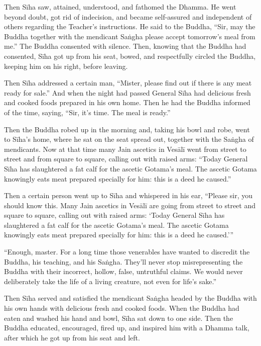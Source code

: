\documentclass[12pt,openany]{book}%
\begin{document}
Then \textsanskrit{Sīha} saw, attained, understood, and fathomed the Dhamma. He went beyond doubt, got rid of indecision, and became self-assured and independent of others regarding the Teacher’s instructions. He said to the Buddha, “Sir, may the Buddha together with the mendicant \textsanskrit{Saṅgha} please accept tomorrow’s meal from me.” The Buddha consented with silence. Then, knowing that the Buddha had consented, \textsanskrit{Sīha} got up from his seat, bowed, and respectfully circled the Buddha, keeping him on his right, before leaving. 

Then \textsanskrit{Sīha} addressed a certain man, “Mister, please find out if there is any meat ready for sale.” And when the night had passed General \textsanskrit{Sīha} had delicious fresh and cooked foods prepared in his own home. Then he had the Buddha informed of the time, saying, “Sir, it’s time. The meal is ready.” 

Then the Buddha robed up in the morning and, taking his bowl and robe, went to \textsanskrit{Sīha}’s home, where he sat on the seat spread out, together with the \textsanskrit{Saṅgha} of mendicants. Now at that time many Jain ascetics in \textsanskrit{Vesālī} went from street to street and from square to square, calling out with raised arms: “Today General \textsanskrit{Sīha} has slaughtered a fat calf for the ascetic Gotama’s meal. The ascetic Gotama knowingly eats meat prepared specially for him: this is a deed he caused.” 

Then a certain person went up to \textsanskrit{Sīha} and whispered in his ear, “Please sir, you should know this. Many Jain ascetics in \textsanskrit{Vesālī} are going from street to street and square to square, calling out with raised arms: ‘Today General \textsanskrit{Sīha} has slaughtered a fat calf for the ascetic Gotama’s meal. The ascetic Gotama knowingly eats meat prepared specially for him: this is a deed he caused.’” 

“Enough, master. For a long time those venerables have wanted to discredit the Buddha, his teaching, and his \textsanskrit{Saṅgha}. They’ll never stop misrepresenting the Buddha with their incorrect, hollow, false, untruthful claims. We would never deliberately take the life of a living creature, not even for life’s sake.” 

Then \textsanskrit{Sīha} served and satisfied the mendicant \textsanskrit{Saṅgha} headed by the Buddha with his own hands with delicious fresh and cooked foods. When the Buddha had eaten and washed his hand and bowl, \textsanskrit{Sīha} sat down to one side. Then the Buddha educated, encouraged, fired up, and inspired him with a Dhamma talk, after which he got up from his seat and left. 
\end{document}
